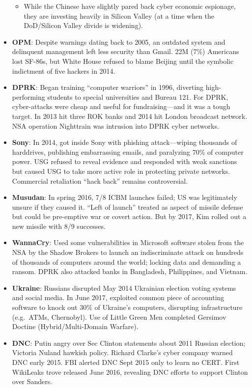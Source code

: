 \documentclass[
]{article}
\providecommand{\tightlist}{%
  \setlength{\itemsep}{0pt}\setlength{\parskip}{0pt}}
\begin{document}
\begin{itemize}
  \begin{itemize}
  \tightlist
  \item
    While the Chinese have slightly pared back cyber economic espionage,
    they are investing heavily in Silicon Valley (at a time when the
    DoD/Silicon Valley divide is widening).
  \end{itemize}
\item
  \textbf{OPM}: Despite warnings dating back to 2005, an outdated system
  and delinquent management left less security than Gmail. 22M (7\%)
  Americans lost SF-86s, but White House refused to blame Beijing until
  the symbolic indictment of five hackers in 2014.
\item
  \textbf{DPRK}: Began training ``computer warriors'' in 1996, diverting
  high-performing students to special universities and Bureau 121. For
  DPRK, cyber-attacks were cheap and useful for fundraising---and it was
  a tough target. In 2013 hit three ROK banks and 2014 hit London
  broadcast network. NSA operation Nighttrain was intrusion into DPRK
  cyber networks.
\item
  \textbf{Sony}: In 2014, got inside Sony with phishing attack---wiping
  thousands of harddrives, publishing embarrassing emails, and
  paralyzing 70\% of computer power. USG refused to reveal evidence and
  responded with weak sanctions but caused USG to take more active role
  in protecting private networks. Commercial retaliation ``hack back''
  remains controversial.
\item
  \textbf{Musudan}: In spring 2016, 7/8 ICBM launches failed; US was
  legitimately unsure if they caused it. ``Left of launch'' treated as
  aspect of missile defense but could be pre-emptive war or covert
  action. But by 2017, Kim rolled out a new missile with 8/9 successes.
\item
  \textbf{WannaCry}: Used some vulnerabilities in Microsoft software
  stolen from the NSA by the Shadow Brokers to launch an indiscriminate
  attack on hundreds of thousands of computers around the world; locking
  data and demanding a ransom. DPRK also attacked banks in Bangladesh,
  Philippines, and Vietnam.
\item
  \textbf{Ukraine}: Russians disrupted May 2014 Ukrainian election
  voting systems and social media. In June 2017, exploited common piece
  of accounting software to knock out 30\% of Ukraine's computers,
  disrupting infrastructure (e.g.~ATMs, Chernobyl). Use of Little Green
  Men completed Gersimov Doctine (Hybrid/Multi-Domain Warfare).
\item
  \textbf{DNC}: Putin angry over Sec Clinton statements about 2011
  Russian election; Victoria Nuland hawkish policy. Richard Clarke's
  cyber company warned DNC early 2015. FBI alerted DNC Sept 2015 only to
  learn no CERT. First WikiLeaks trove released June 2016, revealing DNC
  efforts to support Clinton over Sanders.


\end{itemize}
\end{document}

